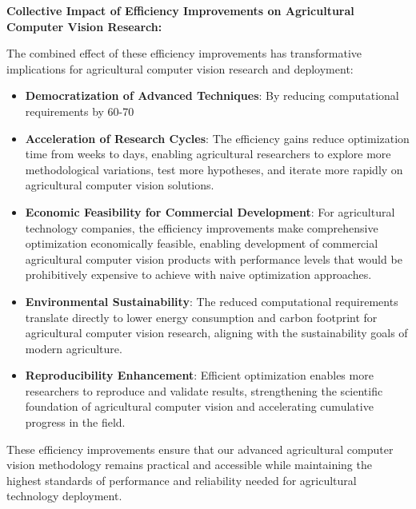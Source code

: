 \textbf{Collective Impact of Efficiency Improvements on Agricultural Computer Vision Research:}

The combined effect of these efficiency improvements has transformative implications for agricultural computer vision research and deployment:

\begin{itemize}
    \item \textbf{Democratization of Advanced Techniques}: By reducing computational requirements by 60-70%
    
    \item \textbf{Acceleration of Research Cycles}: The efficiency gains reduce optimization time from weeks to days, enabling agricultural researchers to explore more methodological variations, test more hypotheses, and iterate more rapidly on agricultural computer vision solutions.
    
    \item \textbf{Economic Feasibility for Commercial Development}: For agricultural technology companies, the efficiency improvements make comprehensive optimization economically feasible, enabling development of commercial agricultural computer vision products with performance levels that would be prohibitively expensive to achieve with naive optimization approaches.
    
    \item \textbf{Environmental Sustainability}: The reduced computational requirements translate directly to lower energy consumption and carbon footprint for agricultural computer vision research, aligning with the sustainability goals of modern agriculture.
    
    \item \textbf{Reproducibility Enhancement}: Efficient optimization enables more researchers to reproduce and validate results, strengthening the scientific foundation of agricultural computer vision and accelerating cumulative progress in the field.
\end{itemize}

These efficiency improvements ensure that our advanced agricultural computer vision methodology remains practical and accessible while maintaining the highest standards of performance and reliability needed for agricultural technology deployment.
